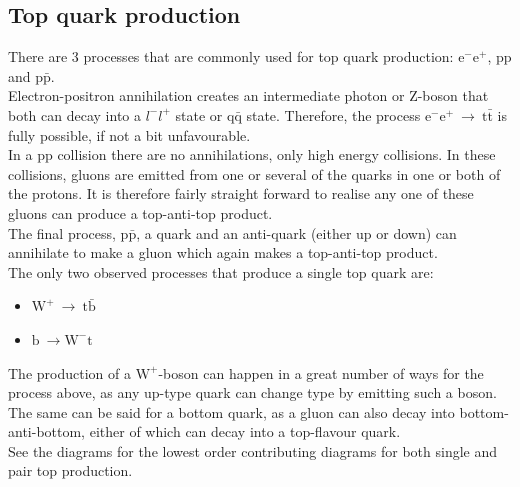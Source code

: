 \documentclass[11pt,a4paper]{article}
\begin{document}
\subsection{Top quark production}
There are 3 processes that are commonly used for top quark production: $\text{e}^-\text{e}^+$, $\text{p}\text{p}$ and $\text{p}\bar{\text{p}}$.\\
Electron-positron annihilation creates an intermediate photon or Z-boson that both can decay into a $l^-l^+$ state or $\text{q}\bar{\text{q}}$ state. Therefore, the process $\text{e}^-\text{e}^+ \:\rightarrow\: \text{t}\bar{\text{t}}$ is fully possible, if not a bit unfavourable.\\
In a pp collision there are no annihilations, only high energy collisions. In these collisions, gluons are emitted from one or several of the quarks in one or both of the protons. It is therefore fairly straight forward to realise any one of these gluons can produce a top-anti-top product.\\
The final process, $\text{p}\bar{\text{p}}$, a quark and an anti-quark (either up or down) can annihilate to make a gluon which again makes a top-anti-top product.\\
The only two observed processes that produce a single top quark are:

\begin{itemize}
	\item $\text{W}^+\:\rightarrow\:\text{t}\bar{\text{b}}$
	\item $\text{b}\:\rightarrow\text{W}^-\text{t}$
\end{itemize}

The production of a $\text{W}^+$-boson can happen in a great number of ways for the process above, as any up-type quark can change type by emitting such a boson. The same can be said for a bottom quark, as a gluon can also decay into bottom-anti-bottom, either of which can decay into a top-flavour quark.\\

See the diagrams for the lowest order contributing diagrams for both single and pair top production.
\end{document}
